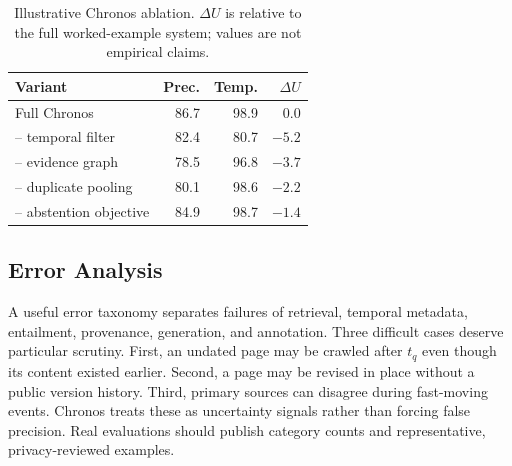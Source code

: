 \begin{table}[t]
  \caption{Illustrative Chronos ablation.  $\Delta U$ is relative to the full
  worked-example system; values are not empirical claims.}
  \label{tab:ablation}
  \centering
  \small
  \begin{tabular}{@{}lrrr@{}}
    \toprule
    Variant & Prec. & Temp. & $\Delta U$ \\
    \midrule
    Full Chronos             & 86.7 & 98.9 & 0.0 \\
    -- temporal filter       & 82.4 & 80.7 & $-5.2$ \\
    -- evidence graph        & 78.5 & 96.8 & $-3.7$ \\
    -- duplicate pooling     & 80.1 & 98.6 & $-2.2$ \\
    -- abstention objective  & 84.9 & 98.7 & $-1.4$ \\
    \bottomrule
  \end{tabular}
\end{table}

\subsection{Error Analysis}

A useful error taxonomy separates failures of retrieval, temporal metadata,
entailment, provenance, generation, and annotation.  Three difficult cases
deserve particular scrutiny.  First, an undated page may be crawled after
$t_q$ even though its content existed earlier.  Second, a page may be revised in
place without a public version history.  Third, primary sources can disagree
during fast-moving events.  Chronos treats these as uncertainty signals rather
than forcing false precision.  Real evaluations should publish category counts
and representative, privacy-reviewed examples.
